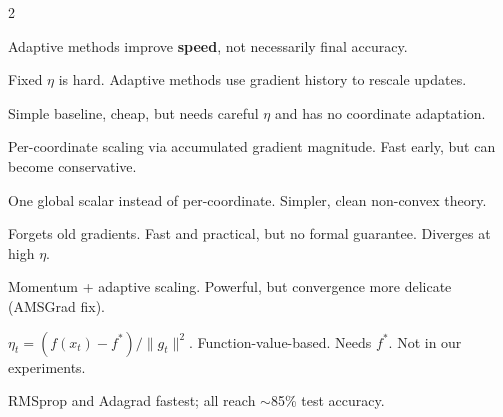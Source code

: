 \documentclass[a4paper,9pt]{article}
\begin{document}
\begin{multicols}{2}

\begin{tcolorbox}[title=\textbf{Main Message}, colback=unibaselteal!15]
Adaptive methods improve \textbf{speed}, not necessarily final accuracy.
\end{tcolorbox}

\begin{tcolorbox}[title=\textbf{Why Adaptive?}, colback=white]
Fixed \(\eta\) is hard. Adaptive methods use gradient history to rescale updates.
\end{tcolorbox}

\begin{tcolorbox}[title=\textbf{SGD}, colback=white]
Simple baseline, cheap, but needs careful \(\eta\) and has no coordinate adaptation.
\end{tcolorbox}

\begin{tcolorbox}[title=\textbf{Adagrad}, colback=white]
Per-coordinate scaling via accumulated gradient magnitude. Fast early, but can become conservative.
\end{tcolorbox}

\begin{tcolorbox}[title=\textbf{AdaGrad-Norm}, colback=white]
One global scalar instead of per-coordinate. Simpler, clean non-convex theory.
\end{tcolorbox}

\begin{tcolorbox}[title=\textbf{RMSprop}, colback=white]
Forgets old gradients. Fast and practical, but no formal guarantee. Diverges at high \(\eta\).
\end{tcolorbox}

\begin{tcolorbox}[title=\textbf{Adam}, colback=white]
Momentum + adaptive scaling. Powerful, but convergence more delicate (AMSGrad fix).
\end{tcolorbox}

\begin{tcolorbox}[title=\textbf{Polyak Step Size}, colback=white]
\(\eta_t = (f(x_t)-f^*)/\|g_t\|^2\). Function-value-based. Needs \(f^*\). Not in our experiments.
\end{tcolorbox}

\begin{tcolorbox}[title=\textbf{A9a Result}, colback=white]
RMSprop and Adagrad fastest; all reach \(\sim\)85\% test accuracy.
\end{tcolorbox}


\end{multicols}
\end{document}

